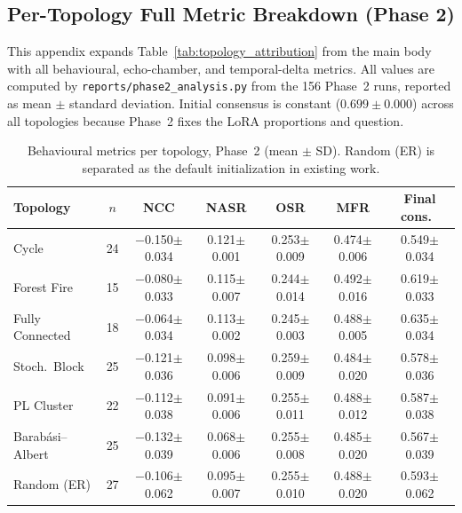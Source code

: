 \documentclass[11pt]{article}
\begin{document}
\subsection{Per-Topology Full Metric Breakdown (Phase 2)}
\label{appendix:per_topology_full}

This appendix expands Table~\ref{tab:topology_attribution} from the main body with all behavioural, echo-chamber, and temporal-delta metrics. All values are computed by \texttt{reports/phase2\_analysis.py} from the 156 Phase~2 runs, reported as mean $\pm$ standard deviation. Initial consensus is constant ($0.699 \pm 0.000$) across all topologies because Phase~2 fixes the LoRA proportions and question.

\begin{table}[h]
\centering
\small
\begin{tabular}{lcccccc}
\toprule
Topology & $n$ & NCC & NASR & OSR & MFR & Final cons.\ \\
\midrule
Cycle               & 24 & $-$0.150$\pm$0.034 & 0.121$\pm$0.001 & 0.253$\pm$0.009 & 0.474$\pm$0.006 & 0.549$\pm$0.034 \\
Forest Fire         & 15 & $-$0.080$\pm$0.033 & 0.115$\pm$0.007 & 0.244$\pm$0.014 & 0.492$\pm$0.016 & 0.619$\pm$0.033 \\
Fully Connected     & 18 & $-$0.064$\pm$0.034 & 0.113$\pm$0.002 & 0.245$\pm$0.003 & 0.488$\pm$0.005 & 0.635$\pm$0.034 \\
Stoch.\ Block       & 25 & $-$0.121$\pm$0.036 & 0.098$\pm$0.006 & 0.259$\pm$0.009 & 0.484$\pm$0.020 & 0.578$\pm$0.036 \\
PL Cluster          & 22 & $-$0.112$\pm$0.038 & 0.091$\pm$0.006 & 0.255$\pm$0.011 & 0.488$\pm$0.012 & 0.587$\pm$0.038 \\
Barab\'{a}si--Albert & 25 & $-$0.132$\pm$0.039 & 0.068$\pm$0.006 & 0.255$\pm$0.008 & 0.485$\pm$0.020 & 0.567$\pm$0.039 \\
\midrule
Random (ER)         & 27 & $-$0.106$\pm$0.062 & 0.095$\pm$0.007 & 0.255$\pm$0.010 & 0.488$\pm$0.020 & 0.593$\pm$0.062 \\
\bottomrule
\end{tabular}
\caption{Behavioural metrics per topology, Phase~2 (mean $\pm$ SD). Random (ER) is separated as the default initialization in existing work.}
\label{tab:appendix_behavioral_per_topo}
\end{table}
\end{document}
